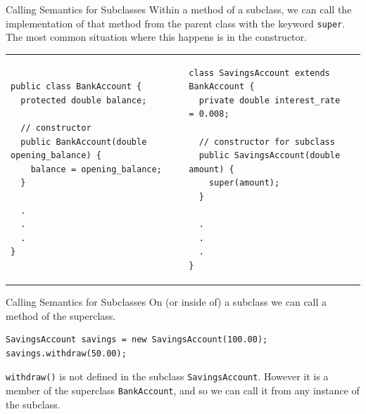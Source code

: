 \documentclass[aspectratio=169]{beamer}
\makeatletter
\newenvironment{splitslide}
{
\centering
\begin{tabular}{@{}m{0.50\textwidth} | m{0.025\textwidth}@{} m{0.4\textwidth}@{} m{0pt}@{}}
}
{
\end{tabular}
}
\makeatother
\begin{document}
\begin{frame}[fragile]{Calling Semantics for Subclasses}
Within a method of a subclass, we can call the implementation of that method from the parent class with the keyword \texttt{super}. \\
\vspace{1em}
The most common situation where this happens is in the constructor. \\
\vspace{1em}
\begin{splitslide}

\begin{Verbatim}[fontsize=\tiny]
public class BankAccount {
  protected double balance;
  
  // constructor
  public BankAccount(double opening_balance) {
    balance = opening_balance;
  }
    
  .
  .
  .
}
\end{Verbatim}

&&

\begin{Verbatim}[fontsize=\tiny]
class SavingsAccount extends BankAccount {
  private double interest_rate = 0.008;
  
  // constructor for subclass
  public SavingsAccount(double amount) {
    super(amount);  
  }
  
  .
  .
  .
}
\end{Verbatim}

\end{splitslide}

\end{frame}



\begin{frame}[fragile]{Calling Semantics for Subclasses}
On (or inside of) a subclass we can call a method of the superclass. \\
\vspace{1em}
\begin{Verbatim}
SavingsAccount savings = new SavingsAccount(100.00);
savings.withdraw(50.00);
\end{Verbatim}
\vspace{1em}
\texttt{withdraw()} is not defined in the subclass \texttt{SavingsAccount}. However it is a member of the superclass \texttt{BankAccount}, and so we can call it from any instance of the subclass.
\end{frame}
\end{document}
